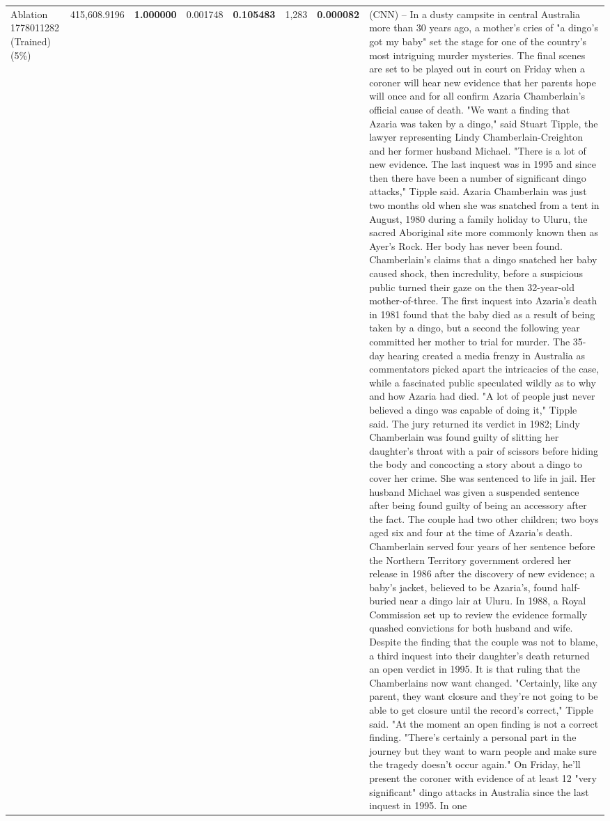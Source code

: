 \begin{table}[H]
\begin{tabular}{llrlllll}
 \\
Ablation 1778011282 (Trained) (5\%) & \color{red} 415,608.9196 & \bfseries \color{red} 1.000000 & \color{red} 0.001748 & \bfseries \color{red} 0.105483 & \color{red} 1,283 & \bfseries \color{red} 0.000082 & (CNN) -- In a dusty campsite in central Australia more than 30 years ago, a mother's cries of "a dingo's got my baby" set the stage for one of the country's most intriguing murder mysteries. The final scenes are set to be played out in court on Friday when a coroner will hear new evidence that her parents hope will once and for all confirm Azaria Chamberlain's official cause of death. "We want a finding that Azaria was taken by a dingo," said Stuart Tipple, the lawyer representing Lindy Chamberlain-Creighton and her former husband Michael. "There is a lot of new evidence. The last inquest was in 1995 and since then there have been a number of significant dingo attacks," Tipple said. Azaria Chamberlain was just two months old when she was snatched from a tent in August, 1980 during a family holiday to Uluru, the sacred Aboriginal site more commonly known then as Ayer's Rock. Her body has never been found. Chamberlain's claims that a dingo snatched her baby caused shock, then incredulity, before a suspicious public turned their gaze on the then 32-year-old mother-of-three. The first inquest into Azaria's death in 1981 found that the baby died as a result of being taken by a dingo, but a second the following year committed her mother to trial for murder. The 35-day hearing created a media frenzy in Australia as commentators picked apart the intricacies of the case, while a fascinated public speculated wildly as to why and how Azaria had died. "A lot of people just never believed a dingo was capable of doing it," Tipple said. The jury returned its verdict in 1982; Lindy Chamberlain was found guilty of slitting her daughter's throat with a pair of scissors before hiding the body and concocting a story about a dingo to cover her crime. She was sentenced to life in jail. Her husband Michael was given a suspended sentence after being found guilty of being an accessory after the fact. The couple had two other children; two boys aged six and four at the time of Azaria's death. Chamberlain served four years of her sentence before the Northern Territory government ordered her release in 1986 after the discovery of new evidence; a baby's jacket, believed to be Azaria's, found half-buried near a dingo lair at Uluru. In 1988, a Royal Commission set up to review the evidence formally quashed convictions for both husband and wife. Despite the finding that the couple was not to blame, a third inquest into their daughter's death returned an open verdict in 1995. It is that ruling that the Chamberlains now want changed. "Certainly, like any parent, they want closure and they're not going to be able to get closure until the record's correct," Tipple said. "At the moment an open finding is not a correct finding. "There's certainly a personal part in the journey but they want to warn people and make sure the tragedy doesn't occur again." On Friday, he'll present the coroner with evidence of at least 12 "very significant" dingo attacks in Australia since the last inquest in 1995. In one 
\end{tabular}
\end{table}
